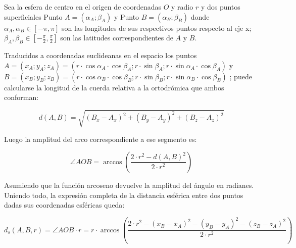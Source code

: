 Sea la esfera de centro en el origen de coordenadas $O$ y radio $r$ y dos puntos superficiales Punto $A=(\alpha_A;\beta_A)$ y Punto $B=(\alpha_B;\beta_B)$ donde $ \alpha_A,\alpha_B \in [-\pi,\pi]$ son las longitudes de sus respectivos puntos respecto al eje x;$ \beta_A,\beta_B \in [-\frac{\pi}{2},\frac{\pi}{2}]$ son las latitudes correspondientes de $A$ y $B$. 

Traducidos a coordenadas euclideanas en el espacio los puntos $A=(x_A;y_A;z_A)=(r\cdot \cos \alpha_A \cdot \cos \beta_A; r \cdot \sin \beta_A; r \cdot \sin \alpha_A \cdot \cos \beta_A)$  y $B=(x_B;y_B;z_B)=(r\cdot \cos \alpha_B \cdot \cos \beta_B; r \cdot \sin \beta_B; r \cdot \sin \alpha_B \cdot \cos \beta_B)$ ; puede calcularse la longitud de la cuerda relativa a la ortodrómica que ambos conforman: 

$$d(A,B) = \sqrt{(B_x-A_x)^2+(B_y-A_y)^2+(B_z-A_z)^2} $$

Luego la amplitud del arco correspondiente a ese segmento es: 

$$\angle AOB = \arccos(\frac{2 \cdot r^2 - d(A,B)^2}{2 \cdot r^2})$$

Asumiendo que la función arcoseno devuelve la amplitud del ángulo en radianes. Uniendo todo, la expresión completa de la distancia esférica entre dos puntos dadas sus coordenadas esféricas queda: 

$$d_s(A,B,r) = \angle AOB \cdot r = r \cdot \arccos ( \frac{2\cdot r^2 - (x_B-x_A)^2 - (y_B-y_A)^2 - (z_B-z_A)^2}{2\cdot r^2} )$$

